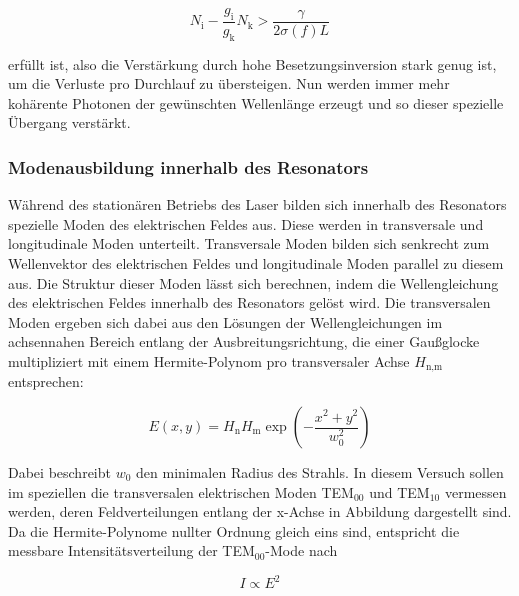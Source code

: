             \begin{equation*}
                N_{\text{i}} - \frac{g_{\text{i}}}{g_{\text{k}}}N_{\text{k}} > \frac{\gamma}{2\sigma (f) L}
                \label{eqn:Schwellwertbedingung}
            \end{equation*}

            erfüllt ist, also die Verstärkung durch hohe Besetzungsinversion stark genug ist, um die Verluste pro Durchlauf zu übersteigen. Nun werden immer mehr kohärente Photonen der gewünschten Wellenlänge 
            erzeugt und so dieser spezielle Übergang verstärkt.


        \subsubsection{Modenausbildung innerhalb des Resonators}
            Während des stationären Betriebs des Laser bilden sich innerhalb des Resonators spezielle Moden des elektrischen Feldes aus. Diese werden in transversale und longitudinale Moden unterteilt. 
            Transversale Moden bilden sich senkrecht zum Wellenvektor des elektrischen Feldes und longitudinale Moden parallel zu diesem aus. Die Struktur dieser Moden lässt sich berechnen, indem die 
            Wellengleichung des elektrischen Feldes innerhalb des Resonators gelöst wird. \newline
            Die transversalen Moden ergeben sich dabei aus den Lösungen der Wellengleichungen im achsennahen Bereich entlang der Ausbreitungsrichtung, die einer Gaußglocke multipliziert mit einem 
            Hermite-Polynom pro transversaler Achse $H_{\text{n,m}}$ entsprechen:

            \begin{equation*}
                E(x,y) = H_{\text{n}} H_{\text{m}} \exp \left(-\frac{x^2+y^2}{w_0^2}\right)
            \end{equation*}

            Dabei beschreibt $w_0$ den minimalen Radius des Strahls.
            In diesem Versuch sollen im speziellen die transversalen elektrischen Moden TEM$_{00}$ und TEM$_{10}$ vermessen werden, deren Feldverteilungen entlang der x-Achse in Abbildung dargestellt sind. 
            Da die Hermite-Polynome nullter Ordnung gleich eins sind, entspricht die messbare Intensitätsverteilung der TEM$_{00}$-Mode nach

            \begin{equation*}
                I \propto E^2
            \end{equation*}


